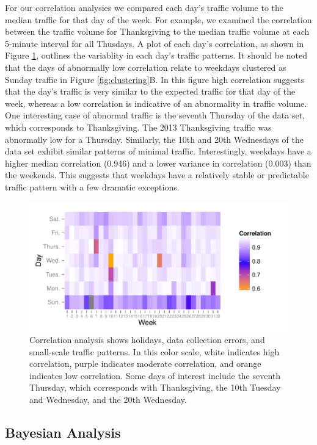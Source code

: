 \documentclass{report}
\begin{document}
For our correlation analysies we compared each day's traffic volume to the median
traffic for that day of the week. For example, we examined the correlation between
the traffic volume for Thanksgiving to the median traffic volume at each 5-minute
interval for all Thusdays. A plot of each day's correlation, as shown in Figure \ref{fig:correlation},
outlines the variablity in each day's traffic patterns. It should be noted that
the days of abnormally low correlation relate to weekdays clustered as Sunday
traffic in Figure \ref{fig:clustering}B. In this figure high correlation suggests that
the day's traffic is very similar to the expected traffic for that day of the week,
whereas a low correlation is indicative of an abnormality in traffic volume.
One interesting case of abnormal traffic is the seventh Thursday of the data set,
which corresponds to Thanksgiving. The 2013 Thanksgiving traffic was abnormally
low for a Thursday. Similarly, the 10th and 20th Wednesdays of the data set
exhibit similar patterns of minimal traffic. Interestingly, weekdays have a higher
median correlation (0.946) and a lower
variance in correlation (0.003) than the weekends. This
suggests that weekdays have a relatively stable or predictable traffic pattern
with a few dramatic exceptions.

\begin{figure}[h]
\centering
\includegraphics{upstat_report-008}
\caption{Correlation analysis shows holidays, data collection errors, and small-scale
traffic patterns. In this color scale, white indicates high correlation, purple
indicates moderate correlation, and orange indicates low correlation. Some days of
interest include the seventh Thursday, which corresponds with Thanksgiving, the
10th Tuesday and Wednesday, and the 20th Wednesday.}
\label{fig:correlation}
\end{figure}


\subsection*{Bayesian Analysis}
\end{document}
